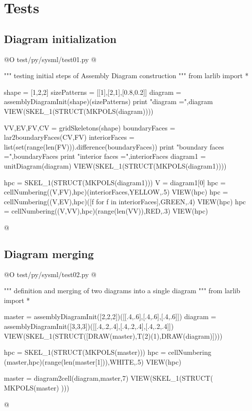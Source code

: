 \documentclass[11pt,oneside]{article}	%
\begin{document}
\section{Tests}
\subsection{Diagram initialization}

@O test/py/sysml/test01.py
@{""" testing initial steps of Assembly Diagram construction """
from larlib import *

shape = [1,2,2]
sizePatterns = [[1],[2,1],[0.8,0.2]]
diagram = assemblyDiagramInit(shape)(sizePatterns)
print "\n diagram =",diagram
VIEW(SKEL_1(STRUCT(MKPOLS(diagram))))

VV,EV,FV,CV = gridSkeletons(shape)
boundaryFaces = lar2boundaryFaces(CV,FV)
interiorFaces = list(set(range(len(FV))).difference(boundaryFaces))
print "\n boundary faces =",boundaryFaces
print "\n interior faces =",interiorFaces
diagram1 = unitDiagram(diagram)
VIEW(SKEL_1(STRUCT(MKPOLS(diagram1))))

hpc = SKEL_1(STRUCT(MKPOLS(diagram1)))
V = diagram1[0]
hpc = cellNumbering((V,FV),hpc)(interiorFaces,YELLOW,.5)
VIEW(hpc)
hpc = cellNumbering((V,EV),hpc)([f for f in interiorFaces],GREEN,.4)
VIEW(hpc)
hpc = cellNumbering((V,VV),hpc)(range(len(VV)),RED,.3)
VIEW(hpc)

@}

\subsection{Diagram merging}

@O test/py/sysml/test02.py
@{""" definition and merging of two diagrams into a single diagram """
from larlib import *

master = assemblyDiagramInit([2,2,2])([[.4,.6],[.4,.6],[.4,.6]])
diagram = assemblyDiagramInit([3,3,3])([[.4,.2,.4],[.4,.2,.4],[.4,.2,.4]])
VIEW(SKEL_1(STRUCT([DRAW(master),T(2)(1),DRAW(diagram)])))

hpc = SKEL_1(STRUCT(MKPOLS(master)))
hpc = cellNumbering (master,hpc)(range(len(master[1])),WHITE,.5)
VIEW(hpc)

master = diagram2cell(diagram,master,7)
VIEW(SKEL_1(STRUCT( MKPOLS(master) )))

@}
\end{document}
